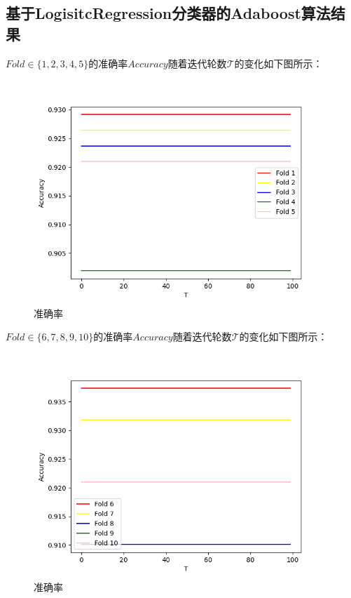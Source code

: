 \documentclass{paper}
\begin{document}
\subsection{基于LogisitcRegression分类器的Adaboost算法结果}


$Fold \in \{1, 2, 3, 4, 5\}$的准确率$Accuracy$随着迭代轮数$\mathcal{T}$的变化如下图所示：
\begin{figure}[H]
    \centering
    \includegraphics[scale=0.8]{images/lacc1.png}
    \caption{准确率}
\end{figure}

$Fold \in \{6, 7, 8, 9, 10\}$的准确率$Accuracy$随着迭代轮数$\mathcal{T}$的变化如下图所示：
\begin{figure}[H]
    \centering
    \includegraphics[scale=0.8]{images/lacc.png}
    \caption{准确率}
\end{figure}
\end{document}
